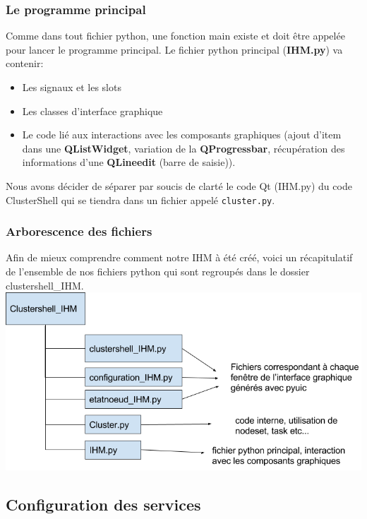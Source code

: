 \documentclass[a4paper,11pt]{article}
\begin{document}
\subsubsection{Le programme principal}

Comme dans tout fichier python, une fonction main existe et doit être appelée pour lancer le programme principal. Le fichier python principal (\textbf{IHM.py}) va contenir:
\begin{itemize}
\item Les signaux et les slots
\item Les classes d'interface graphique
\item Le code lié aux interactions avec les composants graphiques (ajout d'item dans une \textbf{QListWidget}, variation de la \textbf{QProgressbar}, récupération des informations d'une \textbf{QLineedit} (barre de saisie)).
\end{itemize}
Nous avons décider de séparer par soucis de clarté le code Qt (IHM.py) du code ClusterShell qui se tiendra dans un fichier appelé \verb?cluster.py?.
\subsubsection{Arborescence des fichiers}
Afin de mieux comprendre comment notre IHM à été créé, voici un récapitulatif de l'ensemble de nos fichiers python qui sont regroupés dans le dossier clustershell\_IHM.\\
\includegraphics[scale=0.5]{arborescence_fichiers_IHM.jpg} 

\subsection{Configuration des services}
\end{document}
